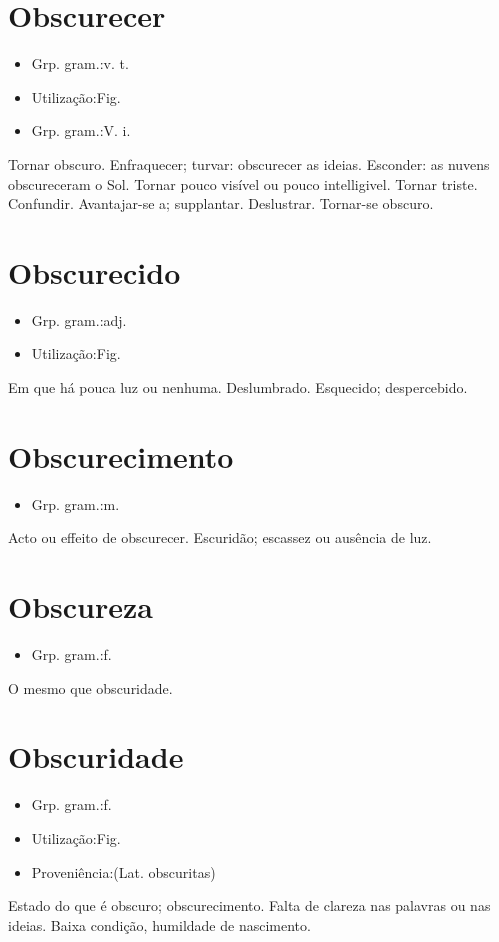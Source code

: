 \section{Obscurecer}
\begin{itemize}
\item {Grp. gram.:v. t.}
\end{itemize}
\begin{itemize}
\item {Utilização:Fig.}
\end{itemize}
\begin{itemize}
\item {Grp. gram.:V. i.}
\end{itemize}
Tornar obscuro.
Enfraquecer; turvar: \textunderscore obscurecer as ideias\textunderscore .
Esconder: \textunderscore as nuvens obscureceram o Sol\textunderscore .
Tornar pouco visível ou pouco intelligivel.
Tornar triste.
Confundir.
Avantajar-se a; supplantar.
Deslustrar.
Tornar-se obscuro.
\section{Obscurecido}
\begin{itemize}
\item {Grp. gram.:adj.}
\end{itemize}
\begin{itemize}
\item {Utilização:Fig.}
\end{itemize}
Em que há pouca luz ou nenhuma.
Deslumbrado.
Esquecido; despercebido.
\section{Obscurecimento}
\begin{itemize}
\item {Grp. gram.:m.}
\end{itemize}
Acto ou effeito de obscurecer.
Escuridão; escassez ou ausência de luz.
\section{Obscureza}
\begin{itemize}
\item {Grp. gram.:f.}
\end{itemize}
O mesmo que \textunderscore obscuridade\textunderscore .
\section{Obscuridade}
\begin{itemize}
\item {Grp. gram.:f.}
\end{itemize}
\begin{itemize}
\item {Utilização:Fig.}
\end{itemize}
\begin{itemize}
\item {Proveniência:(Lat. \textunderscore obscuritas\textunderscore )}
\end{itemize}
Estado do que é obscuro; obscurecimento.
Falta de clareza nas palavras ou nas ideias.
Baixa condição, humildade de nascimento.
